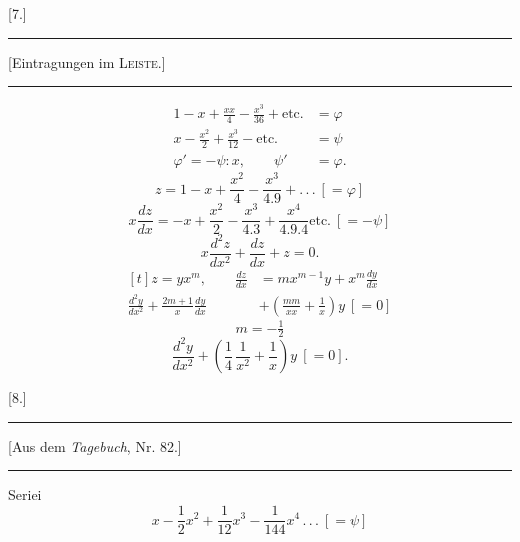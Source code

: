 \begingroup
\makeatletter\tagsleft@true\let\veqno\@@leqno\makeatother
\begin{center}[7.]\par\medskip
\rule{.36\linewidth}{.4pt}\par\smallskip
{\small[Eintragungen im \textsc{Leiste}.]}\par\smallskip
\rule{.36\linewidth}{.4pt}
\end{center}
\noindent{\small[S. 58]}
\[
\begin{aligned}
1-x+\frac{xx}{4}-\frac{x^3}{36}+\text{etc.}&=\varphi\\[.5em]
x-\frac{x^2}{2}+\frac{x^3}{12}-\text{etc.}&=\psi\\[.5em]
\varphi'=-\psi:x,\qquad\psi'&=\varphi.
\end{aligned}
\]
\noindent{\small[S. 65]}
\[
z=1-x+\frac{x^2}{4}-\frac{x^3}{4{.}9}+{.}\,{.}\,{.}\ [=\varphi]
\]
\[
x\frac{dz}{dx}=-x+\frac{x^2}{2}-\frac{x^3}{4{.}3}+\frac{x^4}{4{.}9{.}4}\text{etc.}\ [=-\psi]
\]
\begin{equation}
x\frac{d^2z}{dx^2}+\frac{dz}{dx}+z=0.\tag*{[12]}
\end{equation}
\begin{equation}
\begin{aligned}[t]
z=yx^m,\qquad\frac{dz}{dx}&=mx^{m-1}y+x^m\frac{dy}{dx}\\[.7em]
\frac{d^2y}{dx^2}+\frac{2m+1}{x}\frac{dy}{dx}&+\left(\frac{mm}{xx}+\frac1x\right)y\ [=0]
\end{aligned}\tag*{[13]}
\end{equation}
\clearpage{}
\begin{equation}
m=-\tfrac12\tag*{[14]}
\end{equation}
\begin{equation}
\frac{d^2y}{dx^2}+\left(\frac14\,\frac1{x^2}+\frac1x\right)y\ [=0].\tag*{[15]}
\end{equation}
\ClosingRule
\begin{center}[8.]\par\medskip
\rule{.36\linewidth}{.4pt}\par\smallskip
{\small[Aus dem \textit{Tagebuch}, Nr. 82.]}\par\smallskip
\rule{.36\linewidth}{.4pt}
\end{center}
\noindent\hspace*{\parindent}Seriei
\begin{equation}
x-\frac12x^2+\frac1{12}x^3-\frac1{144}x^4\,{.}\,{.}\,{.}\ [=\psi]\tag*{[16]}
\end{equation}
